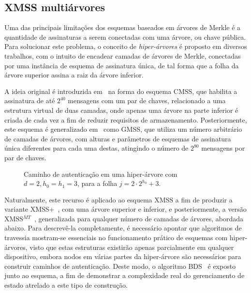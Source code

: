 \documentclass[12pt]{report}
\begin{document}
\subsection{XMSS multiárvores}

Uma das principais limitações dos esquemas baseados em árvores de Merkle é a quantidade de assinaturas a serem conectadas com uma árvore, ou chave pública. Para solucionar este problema, o conceito de \emph{hiper-árvores} é proposto em diversos trabalhos, com o intuito de encadear camadas de árvores de Merkle, conectadas por uma instância de esquema de assinatura única, de tal forma que a folha da árvore superior assina a raiz da árvore inferior.

A ideia original é introduzida em~\cite{Buchmann:2006:CIM:2087445.2087479} na forma do esquema CMSS, que habilita a assinatura de até $2^{40}$ mensagens com um par de chaves, relacionado a uma estrutura virtual de duas camadas, onde apenas uma árvore na parte inferior é criada de cada vez a fim de reduzir requisitos de armazenamento. Posteriormente, este esquema é generalizado em~\cite{Buchmann:2007:MSV:1419765.1419769} como GMSS, que utiliza um número arbitrário de camadas de árvores, com alturas e parâmetros de esquemas de assinatura única diferentes para cada uma destas, atingindo o número de $2^{80}$ mensagens por par de chaves.

\begin{figure}
    \centering
    \caption{Caminho de autenticação em uma hiper-árvore com $d = 2, h_0 = h_1 = 3$, para a folha $j = 2 \cdot 2^{h_0} + 3$.}
    \label{fig:8}
\end{figure}

Naturalmente, este recurso é aplicado ao esquema XMSS a fim de produzir a variante XMSS+~\cite{xmssplus}, com uma árvore superior e inferior, e posteriormente, a versão XMSS$^{MT}$~\cite{xmssmt}, generalizada para qualquer número de camadas de árvores, abordada abaixo. Para descrevê-la completamente, é necessário apontar que algoritmos de travessia mostram-se essenciais no funcionamento prático de esquemas com hiper-árvores, visto que estas estruturas existirão apenas parcialmente em qualquer dispositivo, embora nodos em várias partes da hiper-árvore são necessários para construir caminhos de autenticação. Deste modo, o algoritmo BDS~\cite{Buchmann:2008:MTT:1473109.1473114} é exposto junto ao esquema, a fim de demonstrar a complexidade real do gerenciamento de estado atrelado a este tipo de construção.
\end{document}
